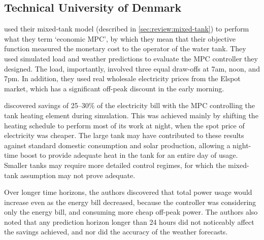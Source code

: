 \subsection{Technical University of Denmark}
\label{sec:review:mpc:halvgaard}

\textcite{Halvgaard12} used their mixed-tank model (described in \autoref{sec:review:mixed-tank}) to perform what they term `economic MPC', by which they mean that their objective function measured the monetary cost to the operator of the water tank.
They used simulated load and weather predictions to evaluate the MPC controller they designed.
The load, importantly, involved three equal draw-offs at 7am, noon, and 7pm.
In addition, they used real wholesale electricity prices from the Elspot market, which has a significant off-peak discount in the early morning.

 discovered savings of 25--30\% of the electricity bill with the MPC controlling the tank heating element during simulation.
This was achieved mainly by shifting the heating schedule to perform most of its work at night, when the spot price of electricity was cheaper.
The large tank may have contributed to these results against standard domestic consumption and solar production, allowing a night-time boost to provide adequate heat in the tank for an entire day of usage.
Smaller tanks may require more detailed control regimes, for which the mixed-tank assumption may not prove adequate.

Over longer time horizons, the authors discovered that total power usage would increase even as the energy bill decreased, because the controller was considering only the energy bill, and consuming more cheap off-peak power.
The authors also noted that any prediction horizon longer than 24 hours did not noticeably affect the savings achieved, and nor did the accuracy of the weather forecasts.
